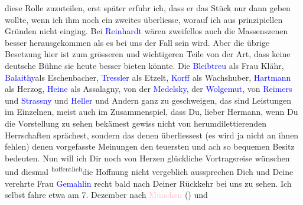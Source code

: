                diese Rolle zuzuteilen, erst später erfuhr ich, dass er das Stück nur dann geben
               wollte, wenn ich ihm noch ein zweites überliesse, worauf ich aus prinzipiellen
               Gründen nicht einging. Bei \textcolor{blue}{Reinhardt}{}\ledrightnote{\textcolor{blue}{Max Reinhardt}} wären
               zweifellos auch die Massenszenen besser herausgekommen als es bei uns der Fall sein
               wird. Aber die übrige Besetzung hier ist zum grösseren und wichtigeren Teile von der
               Art, dass keine deutsche Bühne sie heute besser bieten könnte. Die \textcolor{blue}{Bleibtreu}{}\ledrightnote{\textcolor{blue}{Hedwig Bleibtreu}} als Frau Klähr, \textcolor{blue}{Balaithy}{}\ledrightnote{\textcolor{blue}{Robert von Balajthy}}{ }{\pb}als Eschenbacher, \textcolor{blue}{Tressler}{}\ledrightnote{\textcolor{blue}{Otto Tressler}} als Etzelt, \textcolor{blue}{Korff}{}\ledrightnote{\textcolor{blue}{Arnold Korff}} als Wachshuber, \textcolor{blue}{Hartmann}{}\ledrightnote{\textcolor{blue}{Ernst Hartmann}} als
               Herzog, \textcolor{blue}{Heine}{}\ledrightnote{\textcolor{blue}{Albert Heine}} als Assalagny, von der \textcolor{blue}{Medelsky}{}\ledrightnote{\textcolor{blue}{Lotte Medelsky}}, der \textcolor{blue}{Wolgemut}{}\ledrightnote{\textcolor{blue}{Else Wohlgemuth}}, von \textcolor{blue}{Reimers}{}\ledrightnote{\textcolor{blue}{Georg Reimers}} und \textcolor{blue}{Strassny}{}\ledrightnote{\textcolor{blue}{Fritz Strassni}} und \textcolor{blue}{Heller}{}\ledrightnote{\textcolor{blue}{Eduard Heller}} und Andern ganz zu geschweigen, das sind Leistungen im Einzelnen,
               meist auch im Zusammenspiel, dass Du, lieber Hermann, wenn Du die Vorstellung zu
               sehen bekämest gewiss nicht von herumdilettierenden Herrschaften sprächest, sondern
               das denen überliessest (es wird ja nicht an ihnen fehlen) denen vorgefasste Meinungen
               den teuersten und ach so bequemen Besitz bedeuten.\pend
           \pstart
           Nun will ich Dir noch von Herzen glückliche Vortragsreise wünschen und  diesmal \substVorne{}\textsuperscript{hoffentlich}{\allowbreak}\substDazwischen{}die Hoffnung\substHinten{} nicht vergeblich aussprechen Dich
               und Deine verehrte Frau \textcolor{blue}{Gemahlin}{} recht bald nach Deiner Rückkehr bei uns zu sehen. Ich selbst fahre
               etwa am 7. Dezember nach \textcolor{pink}{München}{}\ledrightnote{\textcolor{pink}{München}} (\label{K_L01981_5v}\label{K_L01981_5h}) und
